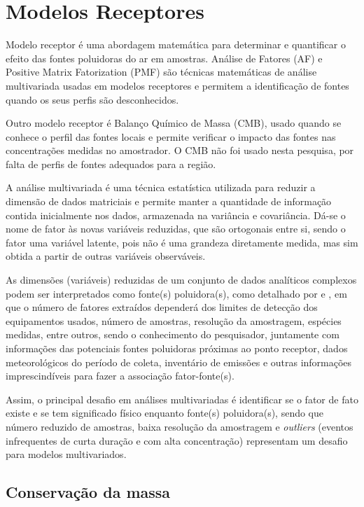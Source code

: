 \section{Modelos Receptores}

Modelo receptor é uma abordagem matemática para determinar e 
quantificar o efeito das fontes poluidoras do ar em amostras.
Análise de Fatores (AF) e Positive Matrix Fatorization (PMF) são técnicas 
matemáticas de análise multivariada usadas em modelos receptores e 
permitem a identificação de fontes quando os seus perfis são desconhecidos.

Outro modelo receptor é Balanço Químico de Massa (CMB), usado quando se conhece 
o perfil das fontes locais e permite verificar o impacto das fontes 
nas concentrações medidas no amostrador. O CMB não foi usado nesta pesquisa, 
por falta de perfis de fontes adequados para a região.

A análise multivariada é uma técnica estatística utilizada para 
reduzir a dimensão de dados matriciais e permite manter a quantidade de 
informação contida inicialmente nos dados, armazenada na variância e covariância. 
Dá-se o nome de fator às novas variáveis reduzidas, que são ortogonais entre si,  
sendo o fator uma variável latente, pois não é uma grandeza diretamente
medida, mas sim obtida a partir de outras variáveis observáveis. 

As dimensões (variáveis) reduzidas de um conjunto de dados analíticos 
complexos podem ser interpretados como fonte(s) poluidora(s), como detalhado por
\citet{wang2012} e \citet{mansha2012}, em que o número de fatores extraídos 
dependerá dos limites de detecção dos equipamentos usados, número de amostras, 
resolução da amostragem, espécies medidas, entre outros, sendo o conhecimento 
do pesquisador, juntamente com informações das potenciais fontes poluidoras 
próximas ao ponto receptor, dados meteorológicos do período de coleta, 
inventário de emissões e outras informações imprescindíveis para fazer a
associação fator-fonte(s). 

Assim, o principal desafio em análises multivariadas
é identificar se o fator de fato existe e se tem significado físico 
enquanto fonte(s) poluidora(s), sendo que número reduzido de amostras, 
baixa resolução da amostragem e \textit{outliers} 
(eventos infrequentes de curta duração e com alta concentração) representam 
um desafio para modelos multivariados.

\subsection{Conservação da massa}

